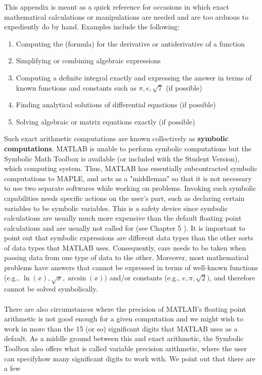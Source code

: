 \documentclass[../main.tex]{subfiles}
\begin{document}
This appendix is meant as a quick reference for occasions in which exact 
mathematical calculations or manipulations are needed and are too arduous to 
expediently do by hand. Examples include the following: 
\begin{enumerate}
	\item Computing the (formula) for the derivative or antiderivative of a function
	\item Simplifying or combining algebraic expressions
	\item Computing a definite integral exactly and expressing the answer in terms of known functions and constants such as $\pi, e, \sqrt{7}$ (if possible)
	\item Finding analytical solutions of differential equations (if possible)
	\item Solving algebraic or matrix equations exactly (if possible)
\end{enumerate}
Such exact arithmetic computations are known collectively as \textbf{symbolic computations}. MATLAB is unable to perform symbolic computations but the Symbolic Math Toolbox is available (or included with the Student Version), which computing system. Thus, MATLAB has essentially subcontracted symbolic computations to MAPLE, and acts as a "middleman" so that it is not necessary to use two separate softwares while working on problems. Invoking such symbolic capabilities needs specific actions on the user's part, such as declaring certain variables to be symbolic variables. This is a safety device since symbolic calculations are usually much more expensive than the default floating point calculations and are usually not called for (see Chapter 5 ). It is important to point out that symbolic expressions are different data types than the other sorts of data types that MATLAB uses. Consequently, care needs to be taken when passing data from one type of data to the other. Moreover, most mathematical problems have answers that cannot be expressed in terms of well-known functions (e.g., $\ln (x), \sqrt{x}, \arcsin (x))$ and/or constants (e.g., $e, \pi, \sqrt{2})$, and therefore cannot be solved symbolically.
\\
\\
There are also circumstances where the precision of MATLAB's floating point 
arithmetic is not good enough for a given computation and we might wish to work 
in more than the 15 (or so) significant digits that MATLAB uses as a default. As a 
middle ground between this and exact arithmetic, the Symbolic Toolbox also 
offers what is called variable precision arithmetic, where the user can specifyhow many significant digits to work with. We point out that there are a few 
\end{document}
